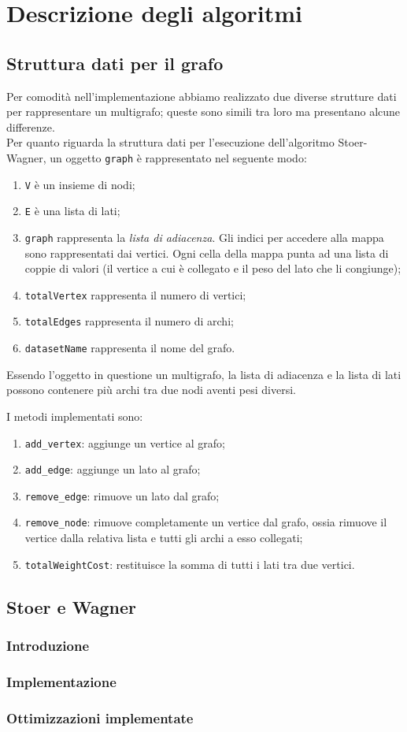 \section{Descrizione degli algoritmi}

\subsection{Struttura dati per il grafo}

Per comodità nell'implementazione abbiamo realizzato due diverse strutture dati per rappresentare un multigrafo; queste sono simili tra loro ma presentano alcune differenze. \\
Per quanto riguarda la struttura dati per l'esecuzione dell'algoritmo Stoer-Wagner, un oggetto \texttt{graph} è rappresentato nel seguente modo:

\begin{enumerate}
    \item \verb|V| è un insieme di nodi;
    \item \verb|E| è una lista di lati;
    \item \verb|graph| rappresenta la \textit{lista di adiacenza}.
    Gli indici per accedere alla mappa sono rappresentati dai vertici.
    Ogni cella della mappa punta ad una lista di coppie di valori
    (il vertice a cui è collegato e il peso del lato che li
    congiunge);
    \item \verb|totalVertex| rappresenta il numero di vertici;
    \item \verb|totalEdges| rappresenta il numero di archi;
    \item \verb|datasetName| rappresenta il nome del grafo.
\end{enumerate}
Essendo l'oggetto in questione un multigrafo, la lista di adiacenza e la lista di lati possono contenere più archi tra due nodi aventi pesi diversi.

\noindent I metodi implementati sono:
\begin{enumerate}
    \item \verb|add_vertex|: aggiunge un vertice al grafo;
    \item \verb|add_edge|: aggiunge un lato al grafo;
    \item \verb|remove_edge|: rimuove un lato dal grafo;
    \item \verb|remove_node|: rimuove completamente un vertice dal grafo, ossia rimuove il vertice dalla relativa lista e tutti gli archi a esso collegati;
    \item \verb|totalWeightCost|: restituisce la somma di tutti i lati tra due vertici.
\end{enumerate}

\subsection{Stoer e Wagner}

\subsubsection{Introduzione}

\subsubsection{Implementazione}

\subsubsection{Ottimizzazioni implementate}
